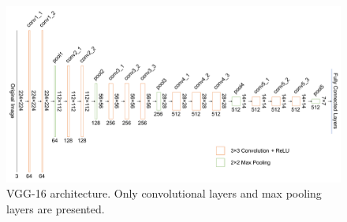 \begin{figure}[!h]
	\centering
	\includegraphics[width=\fig\textwidth]{3-01.pdf}
    \caption{VGG-16 architecture. Only convolutional layers and max pooling layers are presented.}
    \label{fig:vgg16}
\end{figure}